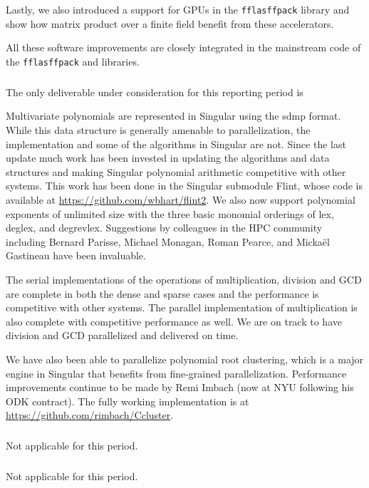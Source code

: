 Lastly, we also introduced a support for GPUs in the \texttt{fflasffpack} library and show how matrix product over a finite
field benefit from these accelerators.

All these software improvements are closely integrated in the mainstream code of the \texttt{fflasffpack} and \Linbox libraries.

  \subparagraph{}
  \label{hpc@hpc-singular}

  The only deliverable under consideration for this reporting period
  is~

Multivariate polynomials are represented in Singular using the sdmp format. While this data structure is generally amenable to parallelization, the implementation and some of the algorithms in Singular are not. Since the last update much work has been invested in updating the algorithms and data structures and making Singular polynomial arithmetic competitive with other systems. This work has been done in the Singular submodule Flint, whose code is available at \url{https://github.com/wbhart/flint2}. We also now support polynomial exponents of unlimited size with the three basic monomial orderings of lex, deglex, and degrevlex. Suggestions by colleagues in the HPC community including Bernard Parisse, Michael Monagan, Roman Pearce, and Micka\"el Gastineau have been invaluable.

The serial implementations of the operations of multiplication, division and GCD are complete in both the dense and sparse cases and the performance is competitive with other systems. The parallel implementation of multiplication is also complete with competitive performance as well. We are on track to have division and GCD parallelized and delivered on time.

We have also been able to parallelize polynomial root clustering, which is a
major engine in Singular that benefits from fine-grained
parallelization. Performance improvements continue to be made by Remi Imbach
(now at NYU following his ODK contract). The fully working implementation is
at \url{https://github.com/rimbach/Ccluster}.




  \subparagraph{}
  \label{hpc@hpc-mpir}

  Not applicable for this period.
  
  \subparagraph{}
  \label{hpc@hpc-combi}

  Not applicable for this period.


